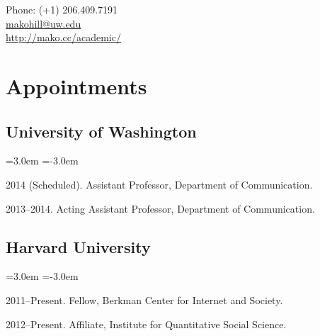\documentclass[10pt]{article}
\makeatletter
\def\myemail{makohill@uw.edu}
\def\myweb{http://mako.cc/academic/}
\newenvironment{cvlist}{
\begin{list}{}{\leftmargin=3.0em \itemindent=-3.0em}
  \setlength{\itemsep}{0pt}
  \setlength{\parskip}{0em}
  \setlength{\parsep}{1em}
  \setlength{\parindent}{0em}}
{\vspace{1em}
\end{list}}
\makeatother
\begin{document}
\pagestyle{fancy}
\renewcommand{\headrulewidth}{0pt}
\fancyhead{}
\fancyfoot{}
\rhead{{\scriptsize\thepage}}


\begin{minipage}[t]{3in}
  
\end{minipage}
\hfill     
\begin{minipage}[t]{0.0in}
\end{minipage}
\hfill
\begin{minipage}[t]{1.7in}
  \flushright \footnotesize Phone: (+1) 206.409.7191 \\ 
  \href{mailto:\myemail}{\myemail} \\
  \href{\myweb}{\myweb}
\end{minipage}

\vspace{2em}


\medskip

\section{Appointments}

\subsection{University of Washington}
\begin{cvlist}
\item 2014 (Scheduled). Assistant Professor, Department of Communication.
\item 2013--2014. Acting Assistant Professor, Department of Communication.
\end{cvlist}


\subsection{Harvard University}
\begin{cvlist}
\item 2011--Present. Fellow, Berkman Center for Internet and Society.
\item 2012--Present. Affiliate, Institute for Quantitative Social Science.
\end{cvlist}
\end{document}
